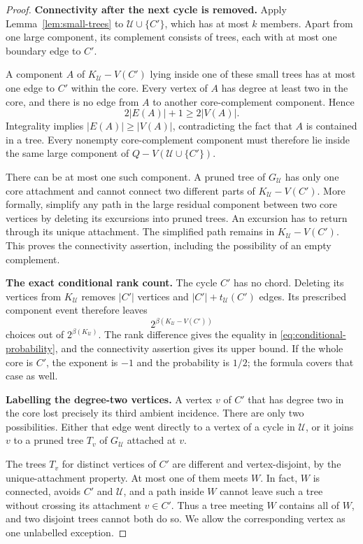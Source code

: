\documentclass[11pt,a4paper]{article}
\numberwithin{equation}{section}
\theoremstyle{definition}
\theoremstyle{remark}
\newcommand{\proofstep}[1]{\par\addvspace{\medskipamount}\noindent\textbf{#1}\enspace\ignorespaces}
\begin{document}
\begin{proof}
\textbf{Connectivity after the next cycle is removed.}\enspace
Apply Lemma~\ref{lem:small-trees} to $\mathcal U\cup\{C'\}$, which has at most $k$ members. Apart from one large component, its complement consists of trees, each with at most one boundary edge to $C'$.

A component $A$ of $K_{\mathcal U}-V(C')$ lying inside one of these small trees has at most one edge to $C'$ within the core. Every vertex of $A$ has degree at least two in the core, and there is no edge from $A$ to another core-complement component. Hence
\[
 2|E(A)|+1\ge2|V(A)|.
\]
Integrality implies $|E(A)|\ge|V(A)|$, contradicting the fact that $A$ is contained in a tree. Every nonempty core-complement component must therefore lie inside the same large component of $Q-V(\mathcal U\cup\{C'\})$.

There can be at most one such component. A pruned tree of $G_{\mathcal U}$ has only one core attachment and cannot connect two different parts of $K_{\mathcal U}-V(C')$. More formally, simplify any path in the large residual component between two core vertices by deleting its excursions into pruned trees. An excursion has to return through its unique attachment. The simplified path remains in $K_{\mathcal U}-V(C')$. This proves the connectivity assertion, including the possibility of an empty complement.

\proofstep{The exact conditional rank count.}
The cycle $C'$ has no chord. Deleting its vertices from $K_{\mathcal U}$ removes $|C'|$ vertices and $|C'|+t_{\mathcal U}(C')$ edges. Its prescribed component event therefore leaves
\[
 2^{\beta(K_{\mathcal U}-V(C'))}
\]
choices out of $2^{\beta(K_{\mathcal U})}$. The rank difference gives the equality in \eqref{eq:conditional-probability}, and the connectivity assertion gives its upper bound. If the whole core is $C'$, the exponent is $-1$ and the probability is $1/2$; the formula covers that case as well.

\proofstep{Labelling the degree-two vertices.}
A vertex $v$ of $C'$ that has degree two in the core lost precisely its third ambient incidence. There are only two possibilities. Either that edge went directly to a vertex of a cycle in $\mathcal U$, or it joins $v$ to a pruned tree $T_v$ of $G_{\mathcal U}$ attached at $v$.

The trees $T_v$ for distinct vertices of $C'$ are different and vertex-disjoint, by the unique-attachment property. At most one of them meets $W$. In fact, $W$ is connected, avoids $C'$ and $\mathcal U$, and a path inside $W$ cannot leave such a tree without crossing its attachment $v\in C'$. Thus a tree meeting $W$ contains all of $W$, and two disjoint trees cannot both do so. We allow the corresponding vertex as one unlabelled exception.


\end{proof}
\end{document}
